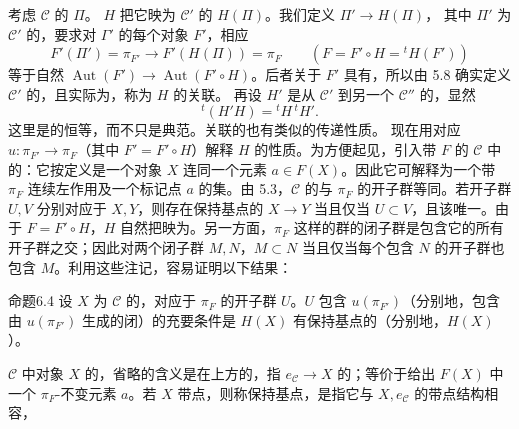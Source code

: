 考虑 $\mathcal C$ 的 $\Pi$。 $H$ 把它映为 $\mathcal C'$ 的 $H(\Pi)$。我们定义 $\Pi'\to H(\Pi)$，
其中 $\Pi'$ 为 $\mathcal C'$ 的，要求对 $\Gamma'$ 的每个对象 $F'$，相应
\[F'(\Pi')=\pi_{F'}\longrightarrow F'(H(\Pi))=\pi_F\qquad(F=F'\circ H={}^tH(F'))\]
等于自然 $\operatorname{Aut}(F')\to\operatorname{Aut}(F'\circ H)$。后者关于 $F'$ 具有，所以由 5.8 确实定义 $\mathcal C'$ 的，且实际为，称为 $H$ 的关联。
再设 $H'$ 是从 $\mathcal C'$ 到另一个 $\mathcal C''$ 的，显然
\[{}^t(H'H)={}^tH\,{}^tH'.\]
这里是的恒等，而不只是典范。关联的也有类似的传递性质。
现在用对应 $u:\pi_{F'}\to\pi_F$（其中 $F'=F'\circ H$）解释 $H$ 的性质。为方便起见，引入带 $F$ 的 $\mathcal C$ 中的：它按定义是一个对象 $X$ 连同一个元素 $a\in F(X)$。因此它可解释为一个带 $\pi_F$ 连续左作用及一个标记点 $a$ 的集。由 5.3，$\mathcal C$ 的与 $\pi_F$ 的开子群等同。若开子群 $U,V$ 分别对应于 $X,Y$，则存在保持基点的 $X\to Y$ 当且仅当 $U\subset V$，且该唯一。由于 $F=F'\circ H$，$H$ 自然把映为。另一方面，$\pi_F$ 这样的群的闭子群是包含它的所有开子群之交；因此对两个闭子群 $M,N$，$M\subset N$ 当且仅当每个包含 $N$ 的开子群也包含 $M$。利用这些注记，容易证明以下结果：
\begin{SGAresult}{命题}{6.4}
设 $X$ 为 $\mathcal C$ 的，对应于 $\pi_F$ 的开子群 $U$。$U$ 包含 $u(\pi_{F'})$（分别地，包含由 $u(\pi_{F'})$ 生成的闭）的充要条件是 $H(X)$ 有保持基点的（分别地，$H(X)$ ）。
\end{SGAresult}
 $\mathcal C$ 中对象 $X$ 的，省略的含义是在上方的，指 $e_{\mathcal C}\to X$ 的；等价于给出 $F(X)$ 中一个 $\pi_F$-不变元素 $a$。若 $X$ 带点，则称保持基点，是指它与 $X,e_{\mathcal C}$ 的带点结构相容，
